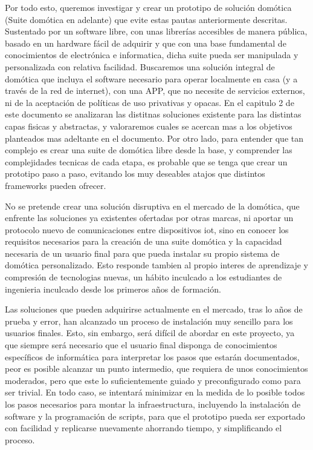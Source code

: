 \vspace{1cm}

Por todo esto, queremos investigar y crear un prototipo de solución domótica (Suite domótica en adelante) que evite estas pautas anteriormente descritas. Sustentado por un software libre, con unas librerías accesibles de manera pública, basado en un hardware fácil de adquirir y que con una base fundamental de conocimientos de electrónica e informatica, dicha suite pueda ser manipulada y personalizada con relativa facilidad. Buscaremos una solución integral de domótica que incluya el software necesario para operar localmente en casa (y a través de la red de internet), con una APP, que no necesite de servicios externos, ni de la aceptación de políticas de uso privativas y opacas. En el capitulo 2 de este documento se analizaran las distitnas soluciones existente para las distintas capas fisicas y abstractas, y valoraremos cuales se acercan mas a los objetivos planteados mas adeltante en el documento. Por otro lado, para entender que tan complejo es crear una suite de domótica libre desde la base, y comprender las complejidades tecnicas de cada etapa, es probable que se tenga que crear un prototipo paso a paso, evitando los muy deseables atajos que distintos frameworks pueden ofrecer.

\vspace{1cm}

No se pretende crear una solución disruptiva en el mercado de la domótica, que enfrente las soluciones ya existentes ofertadas por otras marcas, ni aportar un protocolo nuevo de comunicaciones entre dispositivos \gls{iot}, sino en conocer los requisitos necesarios para la creación de una suite domótica y la capacidad necesaria de un usuario final para que pueda instalar su propio sistema de domótica personalizado. Esto responde tambien al propio interes de aprendizaje y compresión de tecnologias nuevas, un hábito inculcado a los estudiantes de ingenieria inculcado desde los primeros años de formación.

\vspace{1cm}

Las soluciones que pueden adquirirse actualmente en el mercado, tras lo años de prueba y error, han alcanzado un proceso de instalación muy sencillo para los usuarios finales. Esto, sin embargo, será difícil de abordar en este proyecto, ya que siempre será necesario que el usuario final disponga de conocimientos específicos de informática para interpretar los pasos que estarán documentados, peor es posible alcanzar un punto intermedio, que requiera de unos conocimientos moderados, pero que este lo suficientemente guiado y preconfigurado como para ser trivial. En todo caso, se intentará minimizar en la medida de lo posible todos los pasos necesarios para montar la infraestructura, incluyendo la instalación de software y la programación de scripts, para que el prototipo pueda ser exportado con facilidad y replicarse nuevamente ahorrando tiempo, y simplificando el proceso.

